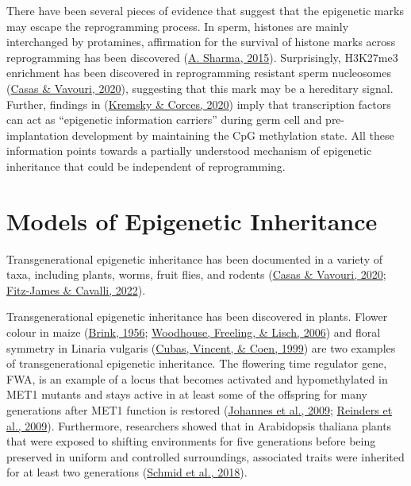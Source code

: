 \documentclass[12pt,twoside]{reedthesis}
\begin{document}
There have been several pieces of evidence that suggest that the
epigenetic marks may escape the reprogramming process. In sperm,
histones are mainly interchanged by protamines, affirmation for the
survival of histone marks across reprogramming has been discovered
(\protect\hyperlink{ref-sharma2015}{A. Sharma, 2015}). Surprisingly, H3K27me3 enrichment has been discovered in
reprogramming resistant sperm nucleosomes (\protect\hyperlink{ref-casas2020}{Casas \& Vavouri, 2020}), suggesting that
this mark may be a hereditary signal. Further, findings in
(\protect\hyperlink{ref-kremsky2020}{Kremsky \& Corces, 2020}) imply that transcription factors can act as ``epigenetic
information carriers'' during germ cell and pre-implantation development
by maintaining the CpG methylation state. All these information points
towards a partially understood mechanism of epigenetic inheritance that
could be independent of reprogramming.

\hypertarget{models-of-epigenetic-inheritance}{%
\section*{Models of Epigenetic Inheritance}\label{models-of-epigenetic-inheritance}}

Transgenerational epigenetic inheritance has been documented in a
variety of taxa, including plants, worms, fruit flies, and rodents
(\protect\hyperlink{ref-casas2020}{Casas \& Vavouri, 2020}; \protect\hyperlink{ref-fitz-james2022}{Fitz-James \& Cavalli, 2022}).

Transgenerational epigenetic inheritance has been discovered in plants.
Flower colour in maize (\protect\hyperlink{ref-brink1956}{Brink, 1956}; \protect\hyperlink{ref-woodhouse2006}{Woodhouse, Freeling, \& Lisch, 2006}) and floral symmetry
in Linaria vulgaris (\protect\hyperlink{ref-cubas1999}{Cubas, Vincent, \& Coen, 1999}) are two examples of transgenerational
epigenetic inheritance. The flowering time regulator gene, FWA, is an
example of a locus that becomes activated and hypomethylated in MET1
mutants and stays active in at least some of the offspring for many
generations after MET1 function is restored (\protect\hyperlink{ref-johannes2009}{Johannes et al., 2009}; \protect\hyperlink{ref-reinders2009}{Reinders et al., 2009}). Furthermore, researchers showed that in Arabidopsis
thaliana plants that were exposed to shifting environments for five
generations before being preserved in uniform and controlled
surroundings, associated traits were inherited for at least two
generations (\protect\hyperlink{ref-schmid2018}{Schmid et al., 2018}).
\end{document}
